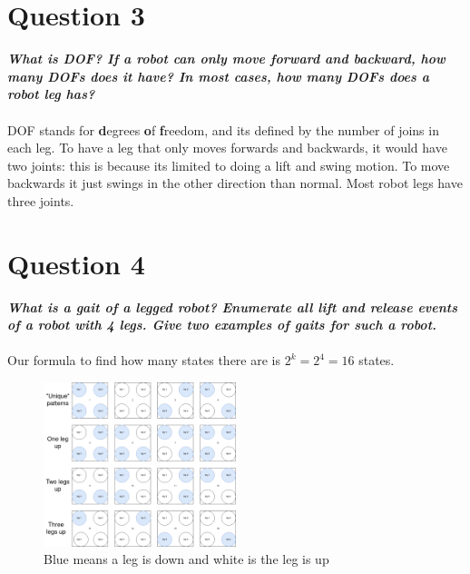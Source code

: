 \documentclass{article}
\newcommand\tab[1][1cm]{\hspace*{#1}}
\begin{document}
\section*{Question 3}
\textbf{\textit{
    \tab What is DOF? If a robot can only move forward and backward, 
    how many DOFs does it have? In most cases, how many DOFs does a robot leg has?
}} \\ \\
DOF stands for \textbf{d}egrees \textbf{o}f \textbf{f}reedom, and its defined by the
number of joins in each leg. To have a leg that only moves forwards and backwards,
it would have two joints: this is because its limited to doing a lift and swing motion.
To move backwards it just swings in the other direction than normal. Most robot legs
have three joints.
\newpage
\section*{Question 4}
\textbf{\textit{
    \tab What is a gait of a legged robot? Enumerate all lift and release 
    events of a robot with 4 legs. Give two examples of gaits for such a robot.
}} \\ \\
Our formula to find how many states there are is $2^k = 2^4 = 16$ states.
\begin{figure}[ht]
    \centering
    \includegraphics[width=0.5\textwidth]{img/gait.png}
    \caption{Blue means a leg is down and white is the leg is up}
\end{figure}
\end{document}
